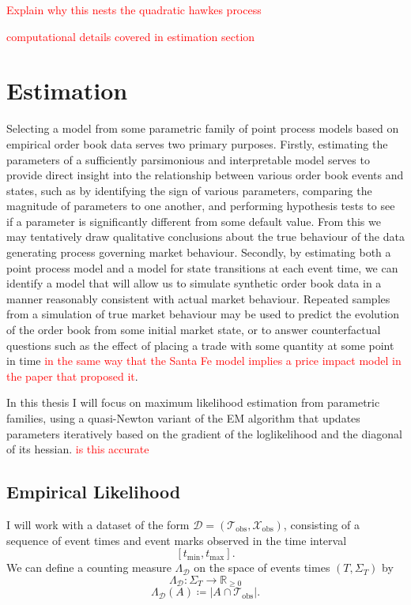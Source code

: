 \documentclass[honours,12pt]{unswthesis}
\numberwithin{equation}{section}
\begin{document}
\textcolor{red}{Explain why this nests the quadratic hawkes process}

\textcolor{red}{computational details covered in estimation section}

\chapter{Estimation}%
Selecting a model from some parametric family of point process models based on empirical order book data serves two primary purposes. Firstly, estimating the parameters of a sufficiently parsimonious and interpretable model serves to provide direct insight into the relationship between various order book events and states, such as by identifying the sign of various parameters, comparing the magnitude of parameters to one another, and performing hypothesis tests to see if a parameter is significantly different from some default value. From this we may tentatively draw qualitative conclusions about the true behaviour of the data generating process governing market behaviour. Secondly, by estimating both a point process model and a model for state transitions at each event time, we can identify a model that will allow us to simulate synthetic order book data in a manner reasonably consistent with actual market behaviour. Repeated samples from a simulation of true market behaviour may be used to predict the evolution of the order book from some initial market state, or to answer counterfactual questions such as the effect of placing a trade with some quantity at some point in time \textcolor{red}{in the same way that the Santa Fe model implies a price impact model in the paper that proposed it}.

In this thesis I will focus on maximum likelihood estimation from parametric families, using a quasi-Newton variant of the EM algorithm that updates parameters iteratively based on the gradient of the loglikelihood and the diagonal of its hessian. \textcolor{red}{is this accurate}

\section{Empirical Likelihood}
I will work with a dataset of the form $\mathcal{D} = \left(\mathcal{T}_\mathrm{obs},\mathcal{X}_\mathrm{obs}\right)$, consisting of a sequence of event times and event marks observed in the time interval $$[t_\mathrm{min},t_\mathrm{max}].$$
We can define a counting measure $\Lambda_\mathcal{D}$ on the space of events times $(T,\Sigma_T)$ by
$$\Lambda_{\mathcal{D}} : \Sigma_T \to \mathbb{R}_{\geq 0}$$
$$\Lambda_{\mathcal{D}}(A) \coloneq \left\vert A\cap\mathcal{T}_\mathrm{obs}\right\vert.$$
\end{document}
